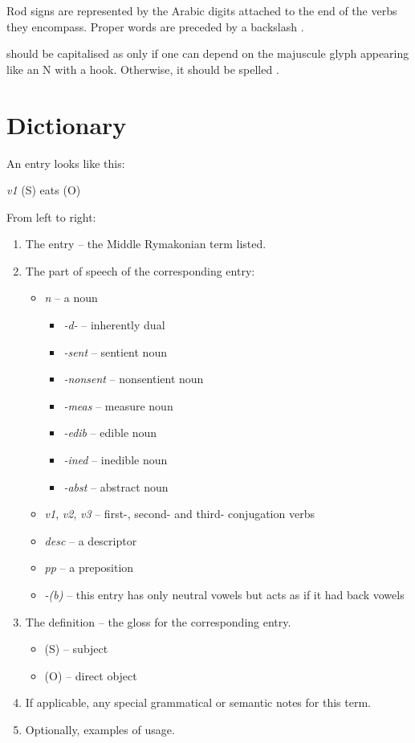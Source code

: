 \documentclass{book}
\newcommand{\lname}{Middle Rymakonian}
\begin{document}
Rod signs are represented by the Arabic digits  attached to the end of the verbs they encompass. Proper words are preceded by a backslash \ortho{\bs{}}.

 should be capitalised as  only if one can depend on the majuscule glyph appearing like an N with a hook. Otherwise, it should be spelled .

\chapter{Dictionary}

An entry looks like this:

 \textit{v1}
\quad (S) eats (O)

From left to right:

\begin{enumerate}
    \item The entry -- the \lname{} term listed.
    \item The part of speech of the corresponding entry:
    \begin{itemize}
        \item \textit{n} -- a noun
        \begin{itemize}
          \item \textit{-d-} -- inherently dual
          \item \textit{-sent} -- sentient noun
          \item \textit{-nonsent} -- nonsentient noun
          \item \textit{-meas} -- measure noun
          \item \textit{-edib} -- edible noun
          \item \textit{-ined} -- inedible noun
          \item \textit{-abst} -- abstract noun
        \end{itemize}
        \item \textit{v1}, \textit{v2}, \textit{v3} -- first-, second- and third- conjugation verbs
        \item \textit{desc} -- a descriptor
        \item \textit{pp} -- a preposition
        \item \textit{-(b)} -- this entry has only neutral vowels but acts as if it had back vowels
    \end{itemize}
    \item The definition -- the gloss for the corresponding entry.
    \begin{itemize}
        \item (S) -- subject
        \item (O) -- direct object
    \end{itemize}
    \item If applicable, any special grammatical or semantic notes for this term.
    \item Optionally, examples of usage.
\end{enumerate}

\begin{multicols}{2}
    
\end{multicols}
\end{document}
